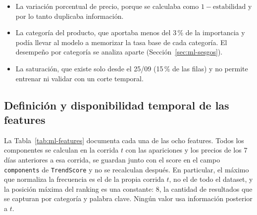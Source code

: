 \begin{itemize}
	\item La variación porcentual de precio, porque se calculaba como $1 - \text{estabilidad}$ y por lo tanto duplicaba información.
	\item La categoría del producto, que aportaba menos del 3\,\% de la importancia y podía llevar al modelo a memorizar la tasa base de cada categoría. El desempeño por categoría se analiza aparte (Sección~\ref{sec:ml-sesgos}).
	\item La saturación, que existe solo desde el 25/09 (15\,\% de las filas) y no permite entrenar ni validar con un corte temporal.
\end{itemize}

\subsection*{Definición y disponibilidad temporal de las features}

La Tabla~\ref{tab:ml-features} documenta cada una de las ocho features. Todos los componentes se calculan en la corrida $t$ con las apariciones y los precios de los 7 días anteriores a esa corrida, se guardan junto con el score en el campo \texttt{components} de \texttt{TrendScore} y no se recalculan después. En particular, el máximo que normaliza la frecuencia es el de la propia corrida $t$, no el de todo el dataset, y la posición máxima del ranking es una constante: 8, la cantidad de resultados que se capturan por categoría y palabra clave. Ningún valor usa información posterior a $t$.

